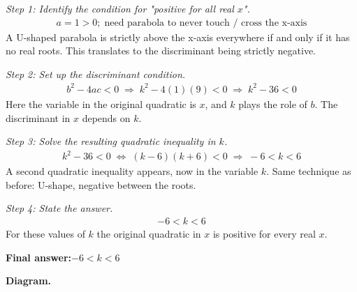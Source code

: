 \documentclass[11pt]{article}
\begin{document}
\textit{Step 1: Identify the condition for "positive for all real \( x \)".}
\[\begin{gathered}
a = 1 > 0; \;\text{need parabola to never touch / cross the x-axis}
\end{gathered}\]
A U-shaped parabola is strictly above the x-axis everywhere if and only if it has no real roots. This translates to the discriminant being strictly negative.

\textit{Step 2: Set up the discriminant condition.}
\[\begin{gathered}
b^2 - 4ac < 0 \;\Longrightarrow\; k^2 - 4(1)(9) < 0 \;\Longrightarrow\; k^2 - 36 < 0
\end{gathered}\]
Here the variable in the original quadratic is \( x \), and \( k \) plays the role of \( b \). The discriminant in \( x \) depends on \( k \).

\textit{Step 3: Solve the resulting quadratic inequality in \( k \).}
\[\begin{gathered}
k^2 - 36 < 0 \;\Longleftrightarrow\; (k - 6)(k + 6) < 0 \;\Longrightarrow\; -6 < k < 6
\end{gathered}\]
A second quadratic inequality appears, now in the variable \( k \). Same technique as before: U-shape, negative between the roots.

\textit{Step 4: State the answer.}
\[\begin{gathered}
-6 < k < 6
\end{gathered}\]
For these values of \( k \) the original quadratic in \( x \) is positive for every real \( x \).

\begin{answerbox}
\textbf{Final answer:}\quad \(\displaystyle -6 < k < 6\)
\end{answerbox}
\textbf{Diagram.}
\end{document}
